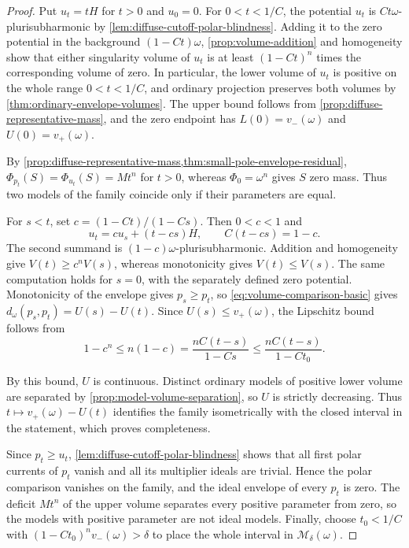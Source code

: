 \begin{proof}
Put $u_t=tH$ for $t>0$ and $u_0=0$. For $0<t<1/C$, the potential $u_t$ is $Ct\omega$-plurisubharmonic by \cref{lem:diffuse-cutoff-polar-blindness}. Adding it to the zero potential in the background $(1-Ct)\omega$, \cref{prop:volume-addition} and homogeneity show that either singularity volume of $u_t$ is at least $(1-Ct)^n$ times the corresponding volume of zero. In particular, the lower volume of $u_t$ is positive on the whole range $0<t<1/C$, and ordinary projection preserves both volumes by \cref{thm:ordinary-envelope-volumes}. The upper bound follows from \cref{prop:diffuse-representative-mass}, and the zero endpoint has $L(0)=v_-(\omega)$ and $U(0)=v_+(\omega)$.

By \cref{prop:diffuse-representative-mass,thm:small-pole-envelope-residual}, $\Phi_{p_t}(S)=\Phi_{u_t}(S)=Mt^n$ for $t>0$, whereas $\Phi_0=\omega^n$ gives $S$ zero mass. Thus two models of the family coincide only if their parameters are equal.

For $s<t$, set $c=(1-Ct)/(1-Cs)$. Then $0<c<1$ and
\[
 u_t=cu_s+(t-cs)H,\qquad
 C(t-cs)=1-c.
\]
The second summand is $(1-c)\omega$-plurisubharmonic. Addition and homogeneity give $V(t)\geq c^nV(s)$, whereas monotonicity gives $V(t)\leq V(s)$. The same computation holds for $s=0$, with the separately defined zero potential. Monotonicity of the envelope gives $p_s\geq p_t$, so \eqref{eq:volume-comparison-basic} gives $d_\omega(p_s,p_t)=U(s)-U(t)$. Since $U(s)\leq v_+(\omega)$, the Lipschitz bound follows from
\[
 1-c^n\leq n(1-c)
       =\frac{nC(t-s)}{1-Cs}
       \leq\frac{nC(t-s)}{1-Ct_0}.
\]

By this bound, $U$ is continuous. Distinct ordinary models of positive lower volume are separated by \cref{prop:model-volume-separation}, so $U$ is strictly decreasing. Thus $t\mapsto v_+(\omega)-U(t)$ identifies the family isometrically with the closed interval in the statement, which proves completeness.

Since $p_t\geq u_t$, \cref{lem:diffuse-cutoff-polar-blindness} shows that all first polar currents of $p_t$ vanish and all its multiplier ideals are trivial. Hence the polar comparison vanishes on the family, and the ideal envelope of every $p_t$ is zero. The deficit $Mt^n$ of the upper volume separates every positive parameter from zero, so the models with positive parameter are not ideal models. Finally, choose $t_0<1/C$ with $(1-Ct_0)^nv_-(\omega)>\delta$ to place the whole interval in $\mathcal M_\delta(\omega)$.
\end{proof}

